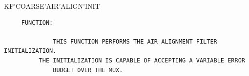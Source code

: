 \begin{frame}
KF'COARSE'AIR'ALIGN'INIT
\begin{verbatim}
     FUNCTION:

              THIS FUNCTION PERFORMS THE AIR ALIGNMENT FILTER INITIALIZATION.
	      THE INITIALIZATION IS CAPABLE OF ACCEPTING A VARIABLE ERROR
              BUDGET OVER THE MUX.


\end{verbatim}
\end{frame}
